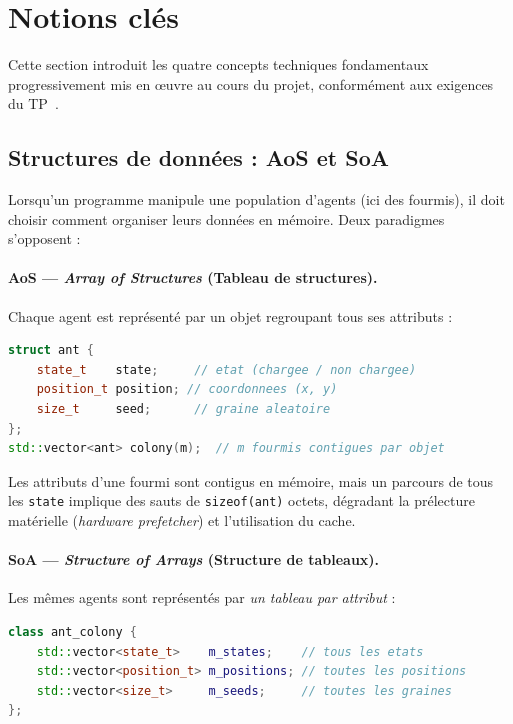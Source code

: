 \section{Notions clés}

Cette section introduit les quatre concepts techniques fondamentaux progressivement
mis en œuvre au cours du projet, conformément aux exigences du TP~\cite{ensta2026os202}.

\subsection{Structures de données : AoS et SoA}

Lorsqu'un programme manipule une population d'agents (ici des fourmis), il doit
choisir comment organiser leurs données en mémoire. Deux paradigmes s'opposent :

\paragraph{AoS — \textit{Array of Structures} (Tableau de structures).}
Chaque agent est représenté par un objet regroupant tous ses attributs :

\begin{lstlisting}[language=C++, caption={Organisation AoS — un objet par fourmi}]
struct ant {
    state_t    state;     // etat (chargee / non chargee)
    position_t position; // coordonnees (x, y)
    size_t     seed;      // graine aleatoire
};
std::vector<ant> colony(m);  // m fourmis contigues par objet
\end{lstlisting}

Les attributs d'une fourmi sont contigus en mémoire, mais un parcours de tous les
\texttt{state} implique des sauts de \texttt{sizeof(ant)} octets, dégradant la
prélecture matérielle (\textit{hardware prefetcher}) et l'utilisation du cache.

\paragraph{SoA — \textit{Structure of Arrays} (Structure de tableaux).}
Les mêmes agents sont représentés par \emph{un tableau par attribut} :

\begin{lstlisting}[language=C++, caption={Organisation SoA — un tableau par attribut}]
class ant_colony {
    std::vector<state_t>    m_states;    // tous les etats
    std::vector<position_t> m_positions; // toutes les positions
    std::vector<size_t>     m_seeds;     // toutes les graines
};
\end{lstlisting}

